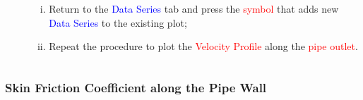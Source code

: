 \documentclass[10pt,compress, unknownkeysallowed]{beamer}
\newcommand{\red}{\textcolor{red}}
\newcommand{\blue}{\textcolor{blue}}
\begin{document}
\begin{frame}
\begin{columns}
\begin{column}[l]{0.5\linewidth}
\begin{enumerate}
           \end{enumerate}
        \end{column}
           \begin{column}[l]{0.5\linewidth}
                    \begin{enumerate}[i)]\scriptsize\setcounter{enumi}{8}
                       \item<2-> Return to the \blue{Data Series} tab and press the \red{symbol} that adds new \blue{Data Series} to the existing plot; 
                       \item<2-> Repeat the procedure to plot the \red{Velocity Profile} along the \red{pipe outlet}.
                    \end{enumerate}
           \end{column}
    \end{columns}
\end{frame}


\subsubsection{Skin Friction Coefficient along the Pipe Wall}
\end{document}
